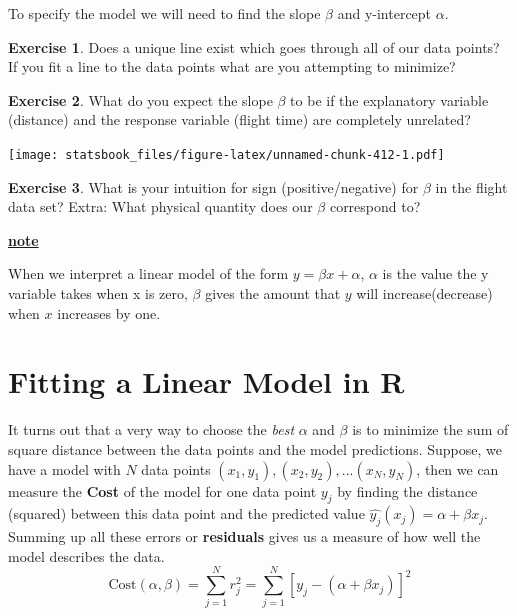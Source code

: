 \documentclass[
]{book}
\newenvironment{rmdblock}[1]
  {\begin{shaded*}
  \centerline{\underline{\textbf{#1}}}

  }
  {
  \end{shaded*}
  }
\newenvironment{note}
  {\begin{rmdblock}{note}}
  {\end{rmdblock}}
\theoremstyle{definition}
\theoremstyle{definition}
\theoremstyle{definition}
\newtheorem{exercise}{Exercise}[chapter]
\theoremstyle{definition}
\theoremstyle{remark}
\begin{document}
To specify the model we will need to find the slope \(\beta\) and y-intercept \(\alpha\).

\begin{exercise}
\protect\hypertarget{exr:unnamed-chunk-410}{}\label{exr:unnamed-chunk-410}Does a unique line exist which goes through all of our data points? If you fit a line to the data points what are you attempting to minimize?
\end{exercise}

\begin{exercise}
\protect\hypertarget{exr:unnamed-chunk-411}{}\label{exr:unnamed-chunk-411}What do you expect the slope \(\beta\) to be if the explanatory variable (distance) and the response variable (flight time) are completely unrelated?
\end{exercise}

\texttt{[image: statsbook\_files/figure-latex/unnamed-chunk-412-1.pdf]}

\begin{exercise}
\protect\hypertarget{exr:unnamed-chunk-413}{}\label{exr:unnamed-chunk-413}What is your intuition for sign (positive/negative) for \(\beta\) in the flight data set? Extra: What physical quantity does our \(\beta\) correspond to?
\end{exercise}

\begin{note}
When we interpret a linear model of the form \(y=\beta x+ \alpha\), \(\alpha\) is the value the y variable takes when x is zero, \(\beta\) gives the amount that \(y\) will increase(decrease) when \(x\) increases by one.\\
\end{note}

\hypertarget{fitting-a-linear-model-in-r}{%
\section{Fitting a Linear Model in R}\label{fitting-a-linear-model-in-r}}

It turns out that a very way to choose the \emph{best} \(\alpha\) and \(\beta\) is to minimize the sum of square distance between the data points and the model predictions. Suppose, we have a model with \(N\) data points \((x_1,y_1), (x_2,y_2), ... (x_N,y_N)\), then we can measure the \textbf{Cost} of the model for one data point \(y_j\) by finding the distance (squared) between this data point and the predicted value \(\hat{y_j}(x_j)=\alpha+\beta x_j\). Summing up all these errors or \textbf{residuals} gives us a measure of how well the model describes the data.
\[
\text{Cost}(\alpha, \beta)=\sum_{j=1}^N r_j^2=\sum_{j=1}^N [y_j-(\alpha+\beta x_j)]^2
\]
\end{document}
